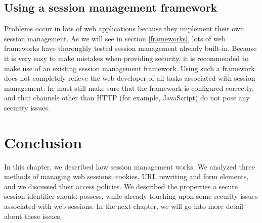 \subsection{Using a session management framework}\label{use-framework}

Problems occur in lots of web applications because they implement their own session management. As we will see in section \ref{frameworks}, lots of web frameworks have thoroughly tested session management already built-in. Because it is very easy to make mistakes when providing security, it is recommended to make use of an existing session management framework. Using such a framework does not completely relieve the web developer of all tasks associated with session management: he must still make sure that the framework is configured correctly, and that channels other than HTTP (for example, JavaScript) do not pose any security issues.

\section{Conclusion} %

In this chapter, we described how session management works. We analyzed three methods of managing web sessions: cookies, URL rewriting and form elements, and we discussed their access policies. We described the properties a secure session identifier should possess, while already touching upon some security issues associated with web sessions. In the next chapter, we will go into more detail about these issues.
